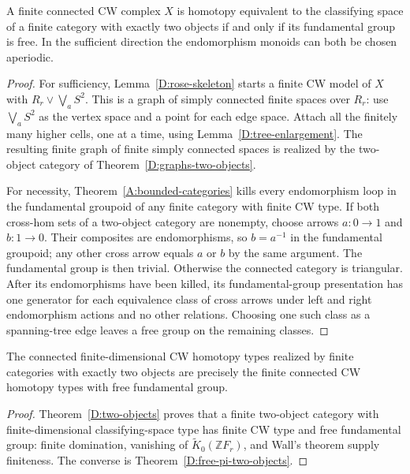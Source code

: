 \begin{theorem}
\label{D:free-pi-two-objects}
A finite connected CW complex $X$ is homotopy equivalent to the
classifying space of a finite category with exactly two objects if and
only if its fundamental group is free. In the sufficient direction the
endomorphism monoids can both be chosen aperiodic.
\end{theorem}
\begin{proof}
For sufficiency, Lemma~\ref{D:rose-skeleton} starts a finite CW model of
$X$ with $R_r\vee\bigvee_a S^2$. This is a graph of simply connected
finite spaces over $R_r$: use $\bigvee_a S^2$ as the vertex space and a
point for each edge space. Attach all the finitely many higher cells,
one at a time, using Lemma~\ref{D:tree-enlargement}. The resulting finite
graph of finite simply connected spaces is realized by the two-object
category of Theorem~\ref{D:graphs-two-objects}.

For necessity, Theorem~\ref{A:bounded-categories} kills every endomorphism
loop in the fundamental groupoid of any finite category with finite
CW type. If both cross-hom sets of a two-object category are nonempty,
choose arrows $a:0\to1$ and $b:1\to0$. Their composites are endomorphisms,
so $b=a^{-1}$ in the fundamental groupoid; any other cross arrow equals
$a$ or $b$ by the same argument. The fundamental group is then trivial.
Otherwise the connected category is triangular. After its endomorphisms
have been killed, its fundamental-group presentation has one generator
for each equivalence class of cross arrows under left and right
endomorphism actions and no other relations. Choosing one such class
as a spanning-tree edge leaves a free group on the remaining classes.
\end{proof}

\begin{corollary}
\label{D:two-object-remaining}
The connected finite-dimensional CW homotopy types realized by finite
categories with exactly two objects are precisely the finite connected
CW homotopy types with free fundamental group.
\end{corollary}
\begin{proof}
Theorem~\ref{D:two-objects} proves that a finite two-object category with
finite-dimensional classifying-space type has finite CW type and free
fundamental group: finite domination, vanishing of
$\widetilde K_0(\mathbb ZF_r)$, and Wall's theorem supply finiteness.
The converse is Theorem~\ref{D:free-pi-two-objects}.
\end{proof}

